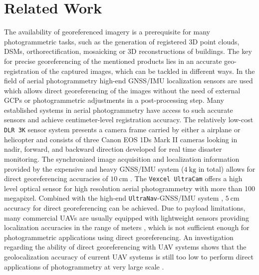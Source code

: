 \section{Related Work}\label{sec:RelWork}
The availability of georeferenced imagery is a prerequisite for many photogrammetric tasks, such as the generation of registered 3D point clouds, DSMs, orthorectification, mosaicking or 3D reconstructions of buildings. 
The key for precise georeferencing of the mentioned products lies in an accurate geo-registration of the captured images, which can be tackled in different ways.
In the field of aerial photogrammetry high-end GNSS/IMU localization sensors are used which allows direct georeferencing of the images without the need of external GCPs or photogrammetric adjustments in a post-processing step. 
Many established systems in aerial photogrammetry have access to such accurate sensors and achieve centimeter-level registration accuracy. 
The relatively low-cost \texttt{DLR 3K} sensor system \cite{kurz2012low} presents a camera frame carried by either a airplane or helicopter and consists of three Canon EOS 1Ds Mark II cameras looking in nadir, forward, and backward direction developed for real time disaster monitoring.
The synchronized image acquisition and localization information provided by the expensive and heavy GNSS/IMU system ($\SI{4}{\kg}$ in total) allows for direct georeferencing accuracies of $\SI{10}{\cm}$ \cite{kurz2014performance}.
The \texttt{Vexcel UltraCam} \cite{ultracam} offers a high level optical sensor for high resolution aerial photogrammetry with more than 100 megapixel. 
Combined with the high-end \texttt{UltraNav}-GNSS/IMU system \cite{ultranav}, $\SI{5}{\cm}$ accuracy for direct georeferencing can be achieved.
Due to payload limitations, many commercial UAVs are usually equipped with lightweight sensors providing localization accuracies in the range of meters \cite{verhoeven2013positioning}, which is not sufficient enough for photogrammetric applications using direct georeferencing. 
An investigation regarding the ability of direct georeferencing with UAV systems shows that the geolocalization accuracy of current UAV systems is still too low to perform direct applications of photogrammetry at very large scale \cite{chiabrando2013direct}.

